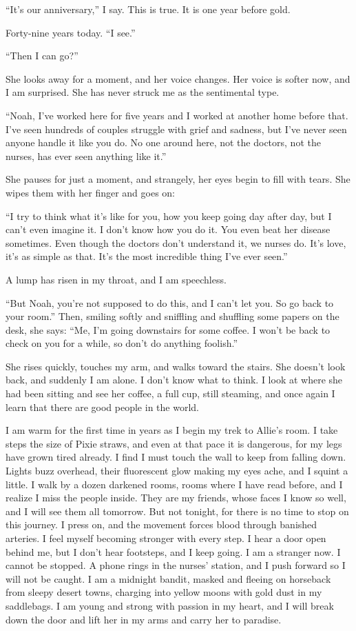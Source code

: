 \documentclass[10pt, twoside, openright]{book}
\begin{document}
``It's our anniversary,'' I say. This is true. It is one year before
gold.


Forty-nine years today. ``I see.''


``Then I can go?''


She looks away for a moment, and her voice changes. Her voice is softer
now, and I am surprised. She has never struck me as the sentimental
type.

``Noah, I've worked here for five years and I worked at another home
before that. I've seen hundreds of couples struggle with grief and
sadness, but I've never seen anyone handle it like you do. No one around
here, not the doctors, not the nurses, has ever seen anything like it.''

She pauses for just a moment, and strangely, her eyes begin to fill with
tears. She wipes them with her finger and goes on:

``I try to think what it's like for you, how you keep going day after
day, but I can't even imagine it. I don't know how you do it. You even
beat her disease sometimes. Even though the doctors don't understand it,
we nurses do. It's love, it's as simple as that. It's the most
incredible thing I've ever seen.''


A lump has risen in my throat, and I am speechless.


``But Noah, you're not supposed to do this, and I can't let you. So go
back to your room.'' Then, smiling softly and sniffling and shuffling
some papers on the desk, she says: ``Me, I'm going downstairs for some
coffee. I won't be back to check on you for a while, so don't do
anything foolish.''

She rises quickly, touches my arm, and walks toward the stairs. She
doesn't look back, and suddenly I am alone. I don't know what to think.
I look at where she had been sitting and see her coffee, a full cup,
still steaming, and once again I learn that there are good people in the
world.

I am warm for the first time in years as I begin my trek to Allie's
room. I take steps the size of Pixie straws, and even at that pace it is
dangerous, for my legs have grown tired already. I find I must touch the
wall to keep from falling down. Lights buzz overhead, their fluorescent
glow making my eyes ache, and I squint a little. I walk by a dozen
darkened rooms, rooms where I have read before, and I realize I miss the
people inside. They are my friends, whose faces I know so well, and I
will see them all tomorrow. But not tonight, for there is no time to
stop on this journey. I press on, and the movement forces blood through
banished arteries. I feel myself becoming stronger with every step. I
hear a door open behind me, but I don't hear footsteps, and I keep
going. I am a stranger now. I cannot be stopped. A phone rings in the
nurses' station, and I push forward so I will not be caught. I am a
midnight bandit, masked and fleeing on horseback from sleepy desert
towns, charging into yellow moons with gold dust in my saddlebags. I am
young and strong with passion in my heart, and I will break down the
door and lift her in my arms and carry her to paradise.
\end{document}
